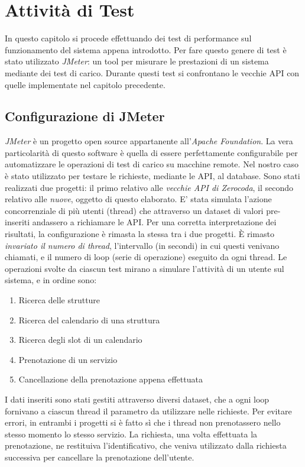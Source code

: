 \chapter{Attività di Test}
\label{chap:testing}
In questo capitolo si procede effettuando dei test di performance sul funzionamento del sistema appena introdotto. Per fare questo genere di test è stato utilizzato \emph{JMeter}: un tool per misurare le prestazioni di un sistema mediante dei test di carico. Durante questi test si confrontano le vecchie API con quelle implementate nel capitolo precedente.

\section{Configurazione di JMeter}
\emph{JMeter} è un progetto open source appartanente all'\emph{Apache Foundation}. La vera particolarità di questo software è quella di essere perfettamente configurabile per automatizzare le operazioni di test di carico su macchine remote. Nel nostro caso è stato utilizzato per testare le richieste, mediante le API, al database. Sono stati realizzati due progetti: il primo relativo alle \textit{vecchie API di Zerocoda}, il secondo relativo alle \textit{nuove}, oggetto di questo elaborato. E' stata simulata l'azione concorrenziale di più utenti (thread) che attraverso un dataset di valori pre-inseriti andassero a richiamare le API. Per una corretta interpretazione dei risultati, la configurazione è rimasta la stessa tra i due progetti. È rimasto \textit{invariato il numero di thread}, l'intervallo (in secondi) in cui questi venivano chiamati, e il numero di loop (serie di operazione) eseguito da ogni thread. Le operazioni svolte da ciascun test mirano a simulare l'attività di un utente sul sistema, e in ordine sono:
\begin{enumerate}
    \item Ricerca delle strutture
    \item Ricerca del calendario di una struttura
    \item Ricerca degli slot di un calendario
    \item Prenotazione di un servizio
    \item Cancellazione della prenotazione appena effettuata
\end{enumerate}
I dati inseriti sono stati gestiti attraverso diversi dataset, che a ogni loop fornivano a ciascun thread il parametro da utilizzare nelle richieste. Per evitare errori, in entrambi i progetti si è fatto sì che i thread non prenotassero nello stesso momento lo stesso servizio. La richiesta, una volta effettuata la prenotazione, ne restituiva l'identificativo, che veniva utilizzato dalla richiesta successiva per cancellare la prenotazione dell'utente.


